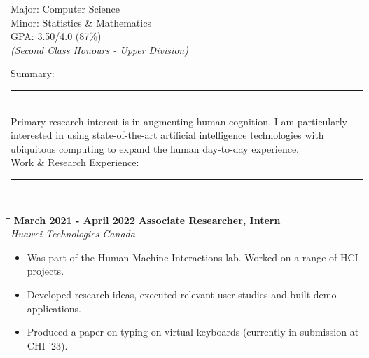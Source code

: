 \documentclass[a4paper,10pt]{article}
\begin{document}
{\begin{minipage}[t]{0.33\textwidth}
\begin{tabbing}
      \> \>  \> {\small Major: Computer Science} \\
      \> \>  \> {\small Minor: Statistics \& Mathematics} \\
      \> \>  \> {\small GPA: 3.50/4.0 (87\%)}\\
      \> \>  \> {\small \emph{(Second Class Honours - Upper Division)}}
    \end{tabbing}
  \end{minipage}
  \hspace{20pt}
  \begin{minipage}[t]{0.60\textwidth}
    \color{black!80}
    \small
    {\large Summary:}\vspace{-0.2cm}\\
    \rule{0.75\textwidth}{0.4pt}
    \vspace{0.1cm}\\
    {\small Primary research interest is in augmenting human cognition. I
    am particularly interested in using state-of-the-art artificial
    intelligence technologies with ubiquitous computing to expand the
    human day-to-day experience. }
    \vspace{0.5cm}\\
    {\large Work \& Research Experience:}\vspace{-0.2cm}\\
    \rule{0.75\textwidth}{0.4pt}
    \vspace{-0.6cm}\\
    \begin{tabbing}
      \=\hspace*{6cm}\=\hspace*{5cm}\= \kill
      \>\textbf{ March 2021 - April 2022} \> \textbf{Associate Researcher, Intern}\\\>\> \emph{Huawei Technologies Canada}
    \end{tabbing}
    \vspace{-0.4cm}
    \begin{itemize}
      \setlength\itemsep{-0.1pt}
    \item Was part of the Human Machine Interactions lab. Worked on a range of HCI projects.
    \item Developed research ideas, executed relevant user studies and built demo applications.
    \item Produced a paper on typing on virtual keyboards (currently in submission at CHI '23).

\end{itemize}
\end{minipage}}
\end{document}
